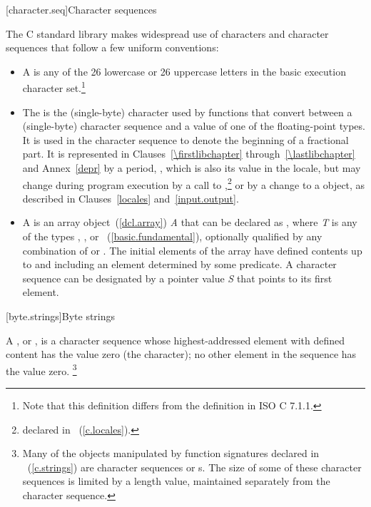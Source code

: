 [character.seq]{Character sequences}

\pnum
The C standard library makes widespread use
%
of characters and character sequences that follow a few uniform conventions:

\begin{itemize}
\item
A
is any of the 26 lowercase or 26
%
%
uppercase letters in the basic execution character set.\footnote{Note that
this definition differs from the definition in ISO C 7.1.1.}
\item
The
is the
%
(single-byte) character used by functions that convert between a (single-byte)
character sequence and a value of one of the floating-point types.
It is used
in the character sequence to denote the beginning of a fractional part.
It is
represented in Clauses~\ref{\firstlibchapter} through~\ref{\lastlibchapter}
and Annex~\ref{depr} by a period,
%
,
which is
also its value in the 
locale, but may change during program
execution by a call to
,\footnote{declared in
~(\ref{c.locales}).
%
%
%
}
or by a change to a
object, as described in Clauses~\ref{locales} and~\ref{input.output}.
\item
A
is an array object~(\ref{dcl.array}) \textit{A} that
can be declared as
,
where \textit{T} is any of the types
,
,
or
~(\ref{basic.fundamental}), optionally qualified by any combination of
or
.
The initial elements of the
array have defined contents up to and including an element determined by some
predicate.
A character sequence can be designated by a pointer value
\textit{S} that points to its first element.
\end{itemize}

[byte.strings]{Byte strings}

\pnum
A
%
%
,
or \ntbs,
is a character sequence whose highest-addressed element
with defined content has the value zero
(the
character); no other element in the sequence has the value zero.%
%
%
\footnote{Many of the objects manipulated by
function signatures declared in
~(\ref{c.strings}) are character sequences or \ntbs{}s.
%
%
The size of some of these character sequences is limited by
a length value, maintained separately from the character sequence.}

